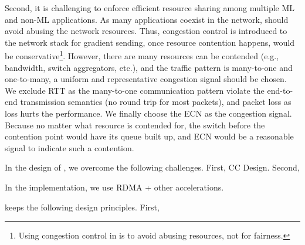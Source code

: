 Second, it is challenging to enforce efficient resource sharing among multiple ML and non-ML applications. As many applications coexist in the network, \sysname should avoid abusing the network resources. Thus, congestion control is introduced to the \sysname network stack for gradient sending, once resource contention happens, \sysname would be conservative\footnote{Using congestion control in \sysname is to avoid abusing resources, not for fairness.}. However, there are many resources can be contended (e.g., bandwidth, switch aggregators, etc.), and the traffic pattern is many-to-one and one-to-many, a uniform and representative congestion signal should be chosen. We exclude RTT as the many-to-one communication pattern violate the end-to-end transmission semantics (no round trip for most packets), and packet loss as loss hurts the performance. We finally choose the ECN as the congestion signal. Because no matter what resource is contended for, the switch before the contention point would have its queue built up, and ECN would be a reasonable signal to indicate such a contention.








In the design of \sysname, we overcome the following challenges. First, CC Design. Second, 

In the implementation, we use RDMA + other accelerations.



\sysname keeps the following design principles. First, 

